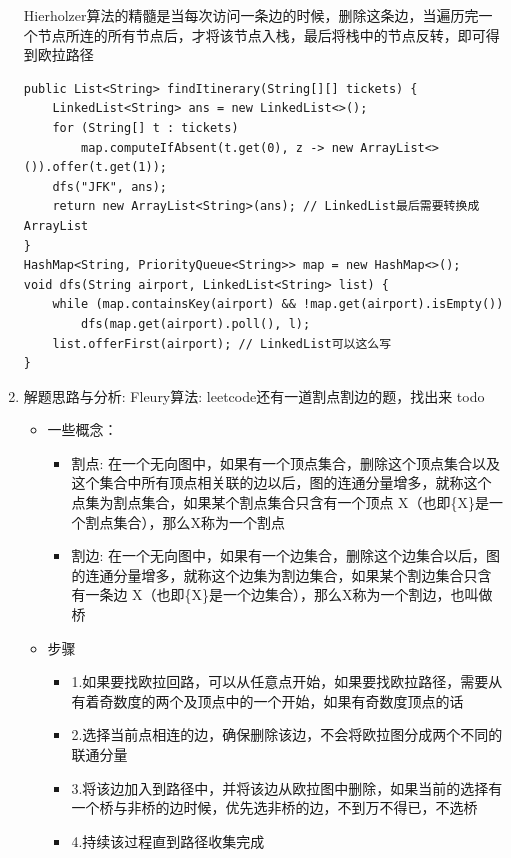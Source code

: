\documentclass[9pt, b5paaper]{book}
\begin{document}
\begin{enumerate}
Hierholzer算法的精髓是当每次访问一条边的时候，删除这条边，当遍历完一个节点所连的所有节点后，才将该节点入栈，最后将栈中的节点反转，即可得到欧拉路径

\begin{verbatim}
public List<String> findItinerary(String[][] tickets) {
    LinkedList<String> ans = new LinkedList<>();
    for (String[] t : tickets)
        map.computeIfAbsent(t.get(0), z -> new ArrayList<>()).offer(t.get(1));
    dfs("JFK", ans);
    return new ArrayList<String>(ans); // LinkedList最后需要转换成ArrayList
}
HashMap<String, PriorityQueue<String>> map = new HashMap<>();
void dfs(String airport, LinkedList<String> list) {
    while (map.containsKey(airport) && !map.get(airport).isEmpty())
        dfs(map.get(airport).poll(), l);
    list.offerFirst(airport); // LinkedList可以这么写
}
\end{verbatim}
\item 解题思路与分析: Fleury算法: leetcode还有一道割点割边的题，找出来 todo
\label{sec-1-5-2-4}
\begin{itemize}
\item 一些概念：
\begin{itemize}
\item 割点: 在一个无向图中，如果有一个顶点集合，删除这个顶点集合以及这个集合中所有顶点相关联的边以后，图的连通分量增多，就称这个点集为割点集合，如果某个割点集合只含有一个顶点 X（也即\{X\}是一个割点集合），那么X称为一个割点
\item 割边: 在一个无向图中，如果有一个边集合，删除这个边集合以后，图的连通分量增多，就称这个边集为割边集合，如果某个割边集合只含有一条边 X（也即\{X\}是一个边集合），那么X称为一个割边，也叫做桥
\end{itemize}

\item 步骤
\begin{itemize}
\item 1.如果要找欧拉回路，可以从任意点开始，如果要找欧拉路径，需要从有着奇数度的两个及顶点中的一个开始，如果有奇数度顶点的话
\item 2.选择当前点相连的边，确保删除该边，不会将欧拉图分成两个不同的联通分量
\item 3.将该边加入到路径中，并将该边从欧拉图中删除，如果当前的选择有一个桥与非桥的边时候，优先选非桥的边，不到万不得已，不选桥
\item 4.持续该过程直到路径收集完成
\end{itemize}


\end{itemize}
\end{enumerate}
\end{document}
